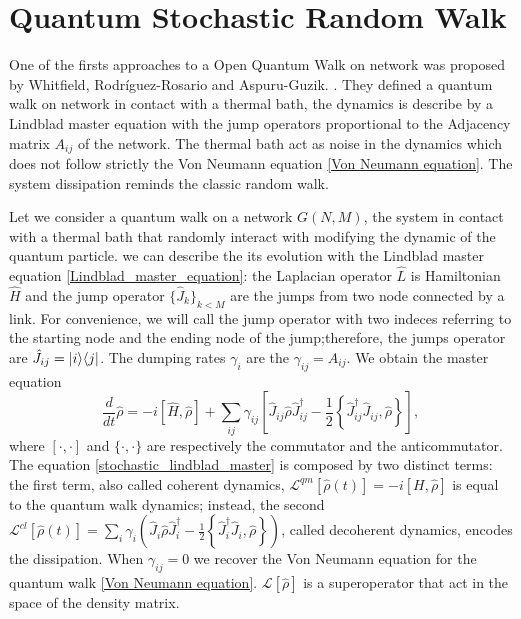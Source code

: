 \section{Quantum Stochastic Random Walk}\label{C_Quantum Stochastic Walk}

One of the firsts approaches to a Open Quantum Walk on network was proposed by Whitfield, Rodr\'iguez-Rosario and Aspuru-Guzik. \cite{QSW}. They defined a quantum walk on network in contact with a thermal bath, the dynamics is describe by a Lindblad master equation with the jump operators proportional to the Adjacency matrix $A_{ij}$ of the network. The thermal bath act as noise in the dynamics which does not follow strictly the Von Neumann equation \eqref{Von Neumann equation}. The system dissipation reminds the classic random walk.

Let we consider a quantum walk on a network $G(N,M)$, the system in contact with a thermal bath that randomly interact with modifying the dynamic of the quantum particle. we can describe the its evolution with the Lindblad master equation \eqref{Lindblad_master_equation}: the Laplacian operator $\hat L$ is Hamiltonian $\hat H$ and the jump operator $\{\hat J_k\}_{k<M}$ are the jumps from two node connected by a link. For convenience, we will call the jump operator with two indeces referring to the starting node and the ending node of the jump;therefore, the jumps operator are $\hat J_{ij} = \lvert i\rangle\langle j\rvert$. The dumping rates $\gamma_i$ are the $\gamma_{ij} =A_{ij}$.
We obtain the master equation
\begin{equation}\label{stochastic_lindblad_master}
    \frac{d}{dt}\hat \rho = -i\left[\hat H,\hat\rho\right] + \sum_{ij}\gamma_{ij}\left[\hat J_{ij} \hat\rho\hat J_{ij}^\dagger -\frac{1}{2} \left\{ \hat J_{ij}^\dagger \hat J_{ij}, \hat\rho\right\}\right],
\end{equation}
where $[\cdot,\cdot]$ and $\{\cdot,\cdot\}$ are respectively the commutator and the anticommutator.
The equation \eqref{stochastic_lindblad_master} is composed by two distinct terms: the first term, also called coherent dynamics,
$\mathcal{L}^{qm}\left[\hat\rho(t)\right] = -i\left[H,\hat\rho\right]$ is equal to the quantum walk dynamics; instead, the second $\mathcal{L}^{cl}\left[\hat\rho(t)\right] = \sum_i \gamma_i \left(\hat J_i \hat\rho \hat J^\dagger_i - \frac{1}{2}\left\{ \hat J^\dagger_i\hat J_i, \hat\rho\right\} \right)$, called decoherent dynamics, encodes the dissipation. 
When $\gamma_{ij} = 0$ we recover the Von Neumann equation for the quantum walk \eqref{Von Neumann equation}. 
$\mathcal{L}\left[\hat\rho\right]$ is a superoperator that act in the space of the density matrix.

